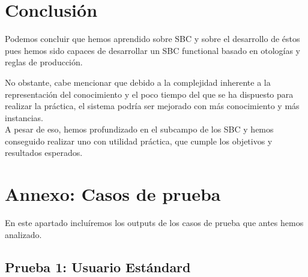 \documentclass[12]{article}
\begin{document}
\section{Conclusión}
Podemos concluir que hemos aprendido sobre SBC y sobre el desarrollo de éstos pues hemos sido capaces de desarrollar un SBC functional basado en otologías y reglas de producción.

No obstante, cabe mencionar que debido a la complejidad inherente a la representación del conocimiento y el poco tiempo del que se ha dispuesto para realizar la práctica, el sistema podría ser mejorado con más conocimiento y más instancias. 
\\

A pesar de eso, hemos profundizado en el subcampo de los SBC y hemos conseguido realizar uno con utilidad práctica, que cumple los objetivos y resultados esperados.

\section{Annexo: Casos de prueba}
En este apartado incluíremos los outputs de los casos de prueba que antes hemos analizado.

\subsection{Prueba 1: Usuario Estándard}
\end{document}

